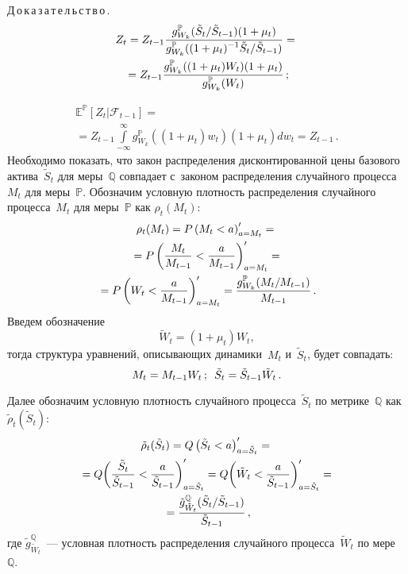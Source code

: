 \begin{multicols}{2}
\noindent
Д\,о\,к\,а\,з\,а\,т\,е\,л\,ь\,с\,т\,в\,о\,.
\begin{multline*}
Z_t=Z_{t-1}\displaystyle\frac{\displaystyle g^{\mathbb{P}}_{W_k}(\tilde{S}_t/\tilde{S}_{t-1})(1+\mu_t)\mathstrut}{\displaystyle  
g^{\mathbb{P}}_{W_k} ((1+\mu_t)^{-1}\tilde{S}_t/\tilde{S}_{t-1})\mathstrut}={}\\
{}= Z_{t-1}\displaystyle\frac{\displaystyle  
g^{\mathbb{P}}_{W_k} ((1+\mu_t)W_t)(1+\mu_t)\mathstrut}{\displaystyle  
g^{\mathbb{P}}_{W_k}(W_t)\mathstrut}\,;
\end{multline*}

\vspace*{-12pt}

\noindent
\begin{multline*}
\mathbb{E}^{\mathbb{P}}\left[ Z_t\vert \mathcal{F}_{t-1}\right] ={}\\
{}=Z_{t-1} 
\int\limits^\infty_{-\infty} g^{\mathbb{P}}_{W_k} \left( 
\left(1+\mu_t\right)w_t\right)\left( 1+\mu_t\right)dw_t=Z_{t-1}\,.
\end{multline*}
Необходимо показать, что закон распределения дисконтированной цены 
базового актива~$\tilde{S}_t$ для меры~$\mathbb{Q}$ совпадает с~законом 
распределения случайного процесса~$M_t$ для меры~$\mathbb{P}$. 
Обозначим условную плотность распределения случайного процесса~$M_t$ 
для меры~$\mathbb{P}$ как $\rho_t(M_t)$: 
\begin{multline*}
\rho_t(M_t)=P\left(M_t<a\right)^\prime_{a=M_t}= {}\\
{}=P\left( \displaystyle\frac{\displaystyle M_t\mathstrut}{\displaystyle M_{t-1}\mathstrut}<\displaystyle\frac{\displaystyle a\mathstrut}{\displaystyle M_{t-
1}\mathstrut}\right)^\prime_{a=M_t}={}\\
{}=P\left( W_t<\displaystyle\frac{\displaystyle a\mathstrut}{\displaystyle M_{t-
1}\mathstrut}\right)^\prime_{a=M_t}=\displaystyle\frac{\displaystyle g^{\mathbb{P}}_{W_k}(M_t/M_{t-1})\mathstrut}{\displaystyle M_{t-
1}\mathstrut}\,.
\end{multline*}
Введем обозначение 
$$
\tilde{W}_t= \left(1+\mu_t\right)W_t,
$$
 тогда структура 
уравнений, описывающих динамики~$M_t$ и~$\tilde{S}_t$, будет совпадать: 
$$
M_t= M_{t-1} W_t\,;\enskip \tilde{S}_t\hm= \tilde{S}_{t-1}\tilde{W}_t\,.
$$

 Далее 
обозначим условную плотность случайного процесса~$\tilde{S}_t$ по 
метрике~$\mathbb{Q}$ как~$\tilde{\rho}_t(\tilde{S}_t)$: 
\begin{multline*}
\tilde{\rho}_t(\tilde{S}_t) =Q\left(\tilde{S}_t<a\right)^\prime_{a=\tilde{S}_t}={}\\
{}= 
Q\!\left( \displaystyle\frac{\displaystyle \tilde{S}_t\mathstrut}{\displaystyle \tilde{S}_{t-1}\mathstrut}<\displaystyle\frac{\displaystyle a\mathstrut}{\displaystyle \tilde{S}_{t-
1}\mathstrut}\right)^\prime_{a=\tilde{S}_t}=Q\!\left( \tilde{W}_t<\displaystyle\frac{\displaystyle a\mathstrut}{\displaystyle \tilde{S}_{t-
1}\mathstrut}\right)^\prime_{a=\tilde{S}_t}={}\\
{}= 
\displaystyle\frac{\displaystyle \tilde{g}^{\mathbb{Q}}_{\tilde{W}_t}(\tilde{S}_t/\tilde{S}_{t-
1})\mathstrut}{\displaystyle \tilde{S}_{t-1}\mathstrut}\,,
\end{multline*}
где $\tilde{g}^{\mathbb{Q}}_{\tilde{W}_t}$~--- условная плот\-ность 
распределения случайного процесса~$\tilde{W}_t$ по мере~$\mathbb{Q}$.


\end{multicols}
